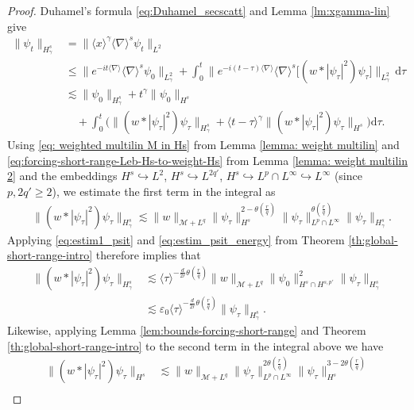 \documentclass[12pt]{article}
\theoremstyle{plain}
\newcommand{\meas}{\mathcal{M}}
\begin{document}
\begin{proof}

Duhamel's formula \eqref{eq:Duhamel_secscatt} and Lemma \ref{lm:xgamma-lin} give
\begin{align*}
\|\psi_t\|_{H^s_\gamma}&=\big\|\langle x\rangle^\gamma\langle\nabla\rangle^s\psi_t\big\|_{L^2}\\
&\le \big\| e^{-it\langle\nabla\rangle}\langle\nabla\rangle^s\psi_0\big\|_{L^2_\gamma}
+ \int_0^t \big\| e^{-i(t-\tau)\langle\nabla\rangle} \langle\nabla\rangle^s\big[(w * |\psi_\tau|^2)\psi_\tau\big]\big\|_{L^2_\gamma}\, \mathrm{d}\tau \\
&\lesssim  \|\psi_0\|_{H^s_\gamma}+t^\gamma\|\psi_0\|_{H^s}\\
&\quad+ \int_0^t \Big(\big\|(w * |\psi_\tau|^2)\psi_\tau\big\|_{H^s_\gamma} +  \langle t-\tau\rangle^\gamma\big\| (w * |\psi_\tau|^2)\psi_\tau\big\|_{H^s}\Big)\mathrm{d}\tau. 
\end{align*}
Using \eqref{eq: weighted multilin M in Hs} from Lemma \ref{lemma: weight multilin} and \eqref{eq:forcing-short-range-Leb-Hs-to-weight-Hs}  from Lemma \ref{lemma: weight multilin 2} and the embeddings $H^s \hookrightarrow L^2$, $H^s \hookrightarrow L^{2q'}$, $H^s\hookrightarrow L^p\cap L^\infty \hookrightarrow L^\infty$ (since $p, 2q'\geq 2$), we estimate the first term in the integral as
\begin{align*}
&\big\|(w * |\psi_\tau|^2)\psi_\tau\big\|_{H^s_\gamma}\lesssim \|w\|_{\meas+L^{q}} \|\psi_\tau\|_{H^s}^{2-\theta(\frac{r}{q})} \|\psi_\tau\|_{L^p\cap L^\infty}^{\theta(\frac{r}{q})}  \|\psi_\tau\|_{H^s_\gamma} .
\end{align*}
Applying \eqref{eq:estim1_psit} and \eqref{eq:estim_psit_energy} from Theorem \ref{th:global-short-range-intro} therefore implies that
    \begin{align*}
\big\|(w * |\psi_\tau|^2)\psi_\tau\big\|_{H^s_\gamma}&\lesssim \langle \tau\rangle^{-\frac{d}{2r}\theta(\frac{r}{q})}\|w\|_{\meas+L^{q}} \|\psi_0\|_{H^s\cap H^{s,p'}}^2 \|\psi_\tau\|_{H^s_\gamma}\\
&\lesssim \varepsilon_0\langle \tau\rangle^{-\frac{d}{2r}\theta(\frac{r}{q})}  \|\psi_\tau\|_{H^s_\gamma}.
\end{align*}
Likewise, applying Lemma \ref{lem:bounds-forcing-short-range} and Theorem \ref{th:global-short-range-intro} to the second term in the integral above we have
\begin{align}
\big\| (w * |\psi_\tau|^2)\psi_\tau\big\|_{H^s}&\lesssim\|w\|_{\meas+L^{q}} \|\psi_\tau\|_{L^{p}\cap L^\infty}^{2\theta(\frac{r}{q})} \|\psi_\tau\|_{H^{s}}^{3-2\theta(\frac{r}{q})}\nonumber\\

\end{align}
\end{proof}
\end{document}
